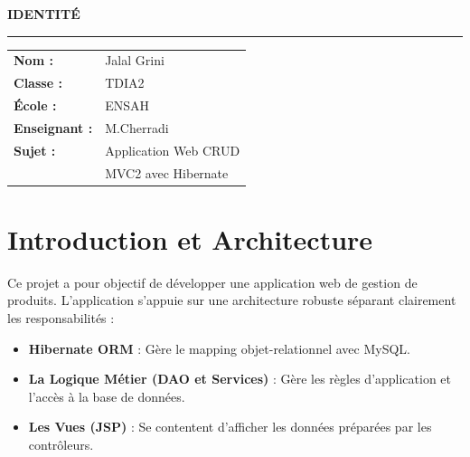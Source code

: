 \documentclass[12pt,a4paper]{article}
\begin{document}
\begin{titlepage}
    \vfill
    \begin{flushright}
    \begin{tcolorbox}[width=8.5cm, colframe=MainBlue, colback=white, boxrule=2pt, arc=10pt, inner sep=15pt, shadow={3mm}{-3mm}{0mm}{ShadowGray}]
        {\large \textbf{IDENTITÉ}} \vspace{5pt} \hrule \vspace{10pt}
        \begin{tabular}{ll}
            \textbf{Nom :} & Jalal Grini \\
            \textbf{Classe :} & TDIA2 \\
            \textbf{École :} & ENSAH \\
            \textbf{Enseignant :} & M.Cherradi \\
            \textbf{Sujet :} & Application Web CRUD \\ 
                            & MVC2 avec Hibernate
        \end{tabular}
    \end{tcolorbox}
    \end{flushright}
    \vspace{2cm}
\end{titlepage}

\newpage
\tableofcontents
\newpage

\section{Introduction et Architecture}
Ce projet a pour objectif de développer une application web de gestion de produits. L'application s'appuie sur une architecture robuste séparant clairement les responsabilités :
\begin{itemize}
    \item \textbf{Hibernate ORM} : Gère le mapping objet-relationnel avec MySQL.
    \item \textbf{La Logique Métier (DAO et Services)} : Gère les règles d'application et l'accès à la base de données.
    \item \textbf{Les Vues (JSP)} : Se contentent d'afficher les données préparées par les contrôleurs.
\end{itemize}
\end{document}

